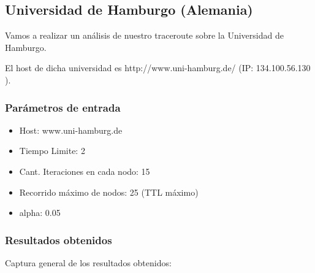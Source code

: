 \newpage
\subsection{Universidad de Hamburgo (Alemania)}
Vamos a realizar un an\'alisis de nuestro traceroute sobre la Universidad de Hamburgo.

El host de dicha universidad es http://www.uni-hamburg.de/ (IP: 134.100.56.130 ).\\	


\subsubsection{Par\'ametros de entrada}
\begin{itemize}
\item Host: www.uni-hamburg.de
\item Tiempo Limite: 2
\item Cant. Iteraciones en cada nodo: 15
\item Recorrido m\'aximo de nodos: 25 (TTL m\'aximo)
\item alpha: 0.05
\end{itemize}

\subsubsection{Resultados obtenidos}

Captura general de los resultados obtenidos: 
\\
\\

